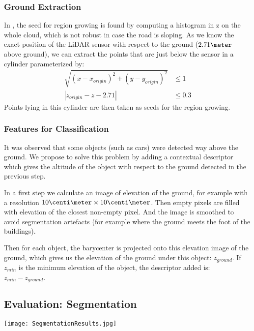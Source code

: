 \documentclass[a4paper, 10pt, journal]{article}
\begin{document}
\subsubsection{Ground Extraction}
In \cite{roynard2016fast}, the seed for region growing is found by computing a histogram in z on the whole cloud, which is not robust in case the road is sloping.
As we know the exact position of the LiDAR sensor with respect to the ground ($2.71\meter$ above ground), we can extract the points that are just below the sensor in a cylinder parameterized by:
\begin{align}
 \sqrt{ (x - x_{origin})^2 + (y - y_{origin})^2 } & \leq 1 \\
 |z_{origin} - z - 2.71| & \leq 0.3
\end{align}
Points lying in this cylinder are then taken as seeds for the region growing.

\subsubsection{Features for Classification}
It was observed that some objects (such as cars) were detected way above the ground. We propose to solve this problem by adding a contextual descriptor which gives the altitude of the object with respect to the ground detected in the previous step.

In a first step we calculate an image of elevation of the ground, for example with a resolution $10\centi\meter \times 10\centi\meter$. Then empty pixels are filled with elevation of the closest non-empty pixel. And the image is smoothed to avoid segmentation artefacts (for example where the ground meets the foot of the buildings).

Then for each object, the barycenter is projected onto this elevation image of the ground, which gives us the elevation of the ground under this object: $z_{ground}$. If $z_{min}$ is the minimum elevation of the object, the descriptor added is: $z_{min} - z_{ground}$.

\subsection{Evaluation: Segmentation}
\begin{center}\centering
 \texttt{[image: SegmentationResults.jpg]}
\end{center}
\end{document}

